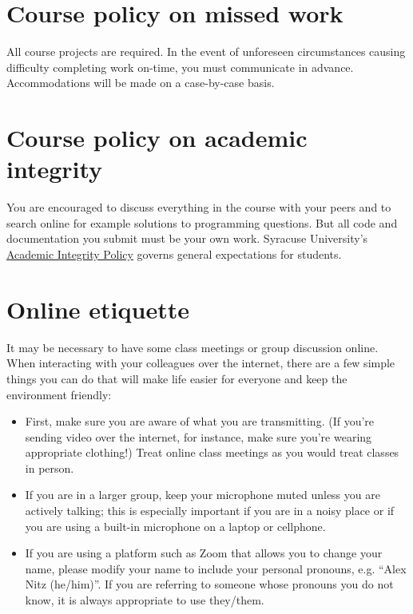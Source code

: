 \documentclass[12pt]{article}
\begin{document}
\section*{Course policy on missed work}

All course projects are required. In the event of unforeseen circumstances causing difficulty completing work on-time, you must communicate in advance. Accommodations will be made on a case-by-case basis.

\section*{Course policy on academic integrity}

You are encouraged to discuss everything in the course with your peers and to search online for example solutions to programming questions. But all code and documentation you submit must be your own work. Syracuse University’s \href{https://class.syr.edu/academic-integrity/policy/}{Academic Integrity Policy} governs general expectations for students.

\section*{Online etiquette}

It may be necessary to have some class meetings or group discussion online. When interacting with your colleagues over the internet, there are a few simple things you can do that will make life easier for everyone and keep the environment friendly:
\begin{itemize}
\item First, make sure you are aware of what you are transmitting. (If you’re sending video over the internet, for instance, make sure you’re wearing appropriate clothing!) Treat online class meetings as you would treat classes in person.
\item If you are in a larger group, keep your microphone muted unless you are actively talking; this is especially important if you are in a noisy place or if you are using a built-in microphone on a laptop or cellphone. 
\item If you are using a platform such as Zoom that allows you to change your name, please modify your name to include your personal pronouns, e.g. “Alex Nitz (he/him)”. If you are referring to someone whose pronouns you do not know, it is always appropriate to use they/them. 
\end{itemize}
\end{document}
